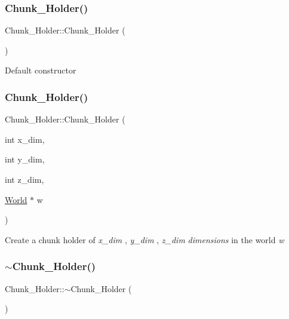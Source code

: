 \subsubsection{\texorpdfstring{Chunk\+\_\+\+Holder()}{Chunk\_Holder()}\hspace{0.1cm}{\footnotesize\ttfamily [1/2]}}
{\footnotesize\ttfamily Chunk\+\_\+\+Holder\+::\+Chunk\+\_\+\+Holder (\begin{DoxyParamCaption}{ }\end{DoxyParamCaption})}

Default constructor \mbox{\label{classChunk__Holder_ab845ac52de9aacae0ea0774ecc531ae9}} 
\subsubsection{\texorpdfstring{Chunk\+\_\+\+Holder()}{Chunk\_Holder()}\hspace{0.1cm}{\footnotesize\ttfamily [2/2]}}
{\footnotesize\ttfamily Chunk\+\_\+\+Holder\+::\+Chunk\+\_\+\+Holder (\begin{DoxyParamCaption}\item[{int}]{x\+\_\+dim,  }\item[{int}]{y\+\_\+dim,  }\item[{int}]{z\+\_\+dim,  }\item[{\mbox{\hyperlink{classWorld}{World}} $\ast$}]{w }\end{DoxyParamCaption})}

Create a chunk holder of {\itshape x\+\_\+dim} {\itshape }, {\itshape y\+\_\+dim} {\itshape }, {\itshape z\+\_\+dim} {\itshape dimensions} in the world {\itshape w} {\itshape } \mbox{\label{classChunk__Holder_a7375802ba42f6851efa425bcdbbfe4c2}} 
\subsubsection{\texorpdfstring{$\sim$\+Chunk\+\_\+\+Holder()}{~Chunk\_Holder()}}
{\footnotesize\ttfamily Chunk\+\_\+\+Holder\+::$\sim$\+Chunk\+\_\+\+Holder (\begin{DoxyParamCaption}{ }\end{DoxyParamCaption})}

